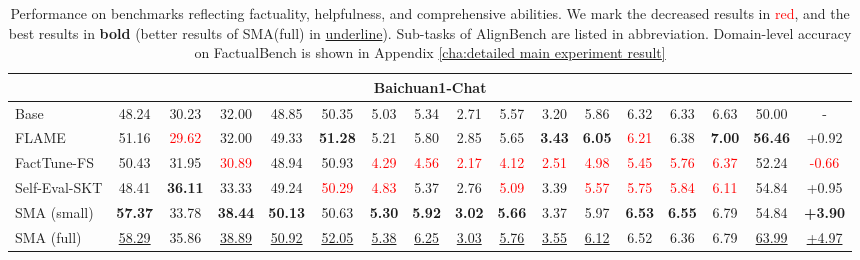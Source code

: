 \begin{table*}[ht]
{\begin{tabular}{l|ccccc|ccccccccc|c|c}
     \midrule
    \multicolumn{17}{c}{\sc Baichuan1-Chat} \\ 
    \midrule
     Base  & 48.24 & 30.23 & 32.00 & 48.85 & 50.35 & 5.03 & 5.34 & 2.71 & 5.57 & 3.20 & 5.86 & 6.32 & 6.33 & 6.63 & 50.00 & -  \\ 
     \midrule
     FLAME  & 51.16 & \textcolor{red}{29.62} & 32.00 & 49.33 & \bf 51.28 & 5.21 & 5.80 & 2.85 & 5.65 & \bf 3.43 & \bf 6.05 & \textcolor{red}{6.21} & 6.38 & \bf 7.00 & \bf 56.46 & +0.92  \\
     FactTune-FS  & 50.43 & 31.95 & \textcolor{red}{30.89} & 48.94 & 50.93 & \textcolor{red}{4.29} & \textcolor{red}{4.56} & \textcolor{red}{2.17} & \textcolor{red}{4.12} & \textcolor{red}{2.51} & \textcolor{red}{4.98} & \textcolor{red}{5.45} & \textcolor{red}{5.76} & \textcolor{red}{6.37}  & 52.24 & \textcolor{red}{-0.66}  \\
     Self-Eval-SKT & 48.41 & \bf 36.11 & 33.33 & 49.24 & \textcolor{red}{50.29} & \textcolor{red}{4.83} & 5.37 & 2.76 & \textcolor{red}{5.09} & 3.39 & \textcolor{red}{5.57} & \textcolor{red}{5.75} & \textcolor{red}{5.84} & \textcolor{red}{6.11}  & 54.84 & +0.95 \\ 
     \midrule
     SMA (small) & \bf 57.37 & 33.78 & \bf 38.44 & \bf 50.13 & 50.63 & \bf 5.30 & \bf 5.92 & \bf 3.02 & \bf 5.66 & 3.37 & 5.97 & \bf 6.53 & \bf 6.55 & 6.79 & 54.84 & \bf +3.90  \\ 
     \midrule
     SMA (full) & \underline{58.29} & 35.86 & \underline{38.89} & \underline{50.92} & \underline{52.05} & \underline{5.38} & \underline{6.25} & \underline{3.03} & \underline{5.76} & \underline{3.55} & \underline{6.12} & 6.52 & 6.36 & 6.79 & \underline{63.99} & \underline{+4.97}  \\ 
     \bottomrule[1.5pt]
    \end{tabular}
    }
  \caption{\label{tab:main result}
    Performance on benchmarks reflecting factuality, helpfulness, and comprehensive abilities. We mark the decreased results in \textcolor{red}{red}, and the best results in \textbf{bold} (better results of SMA(full) in \underline{underline}). Sub-tasks of AlignBench are listed in abbreviation. Domain-level accuracy on FactualBench is shown in Appendix \ref{cha:detailed main experiment result}
  }
\end{table*}

